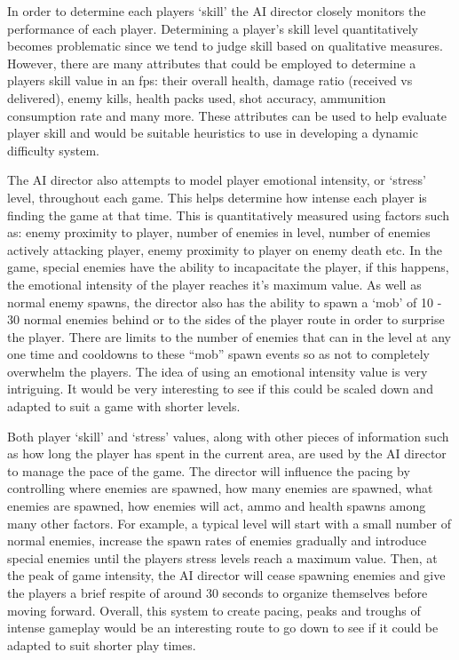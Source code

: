 \documentclass[journal]{IEEEtran}
\begin{document}
In order to determine each players `skill' the AI director closely monitors the performance of each player. Determining a player's skill level quantitatively becomes problematic since we tend to judge skill based on qualitative measures. However, there are many attributes that could be employed to determine a players skill value in an fps: their overall health, damage ratio (received vs delivered), enemy kills, health packs used, shot accuracy, ammunition consumption rate and many more. These attributes can be used to help evaluate player skill and would be suitable heuristics to use in developing a dynamic difficulty system.

The AI director also attempts to model player emotional intensity, or `stress' level, throughout each game. This helps determine how intense each player is finding the game at that time. This is quantitatively measured using factors such as: enemy proximity to player, number of enemies in level, number of enemies actively attacking player, enemy proximity to player on enemy death etc. In the game, special enemies have the ability to incapacitate the player, if this happens, the emotional intensity of the player reaches it's maximum value. As well as normal enemy spawns, the director also has the ability to spawn a `mob' of 10 - 30 normal enemies behind or to the sides of the player route in order to surprise the player. There are limits to the number of enemies that can in the level at any one time and cooldowns to these ``mob'' spawn events so as not to completely overwhelm the players. The idea of using an emotional intensity value is very intriguing. It would be very interesting to see if this could be scaled down and adapted to suit a game with shorter levels. 

Both player `skill' and `stress' values, along with other pieces of information such as how long the player has spent in the current area, are used by the AI director to manage the pace of the game. The director will influence the pacing by controlling where enemies are spawned, how many enemies are spawned, what enemies are spawned, how enemies will act, ammo and health spawns among many other factors. For example, a typical level will start with a small number of normal enemies, increase the spawn rates of enemies gradually and introduce special enemies until the players stress levels reach a maximum value. Then, at the peak of game intensity, the AI director will cease spawning enemies and give the players a brief respite of around 30 seconds to organize themselves before moving forward.
Overall, this system to create pacing, peaks and troughs of intense gameplay would be an interesting route to go down to see if it could be adapted to suit shorter play times. 
 
\end{document}
